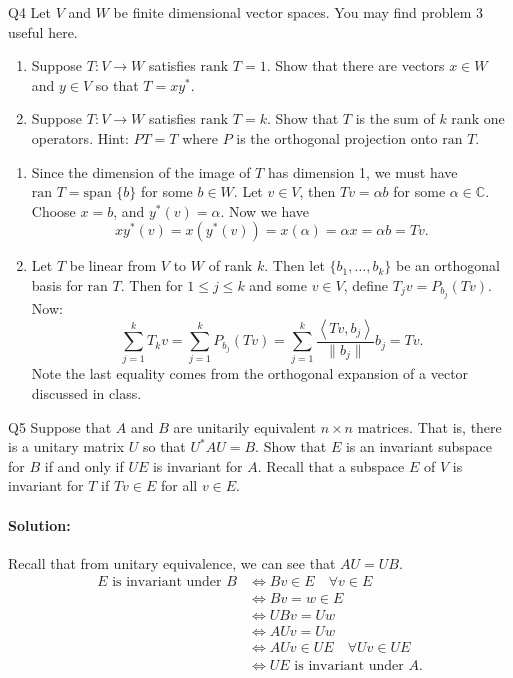 \documentclass{article}
\begin{document}
\begin{prob}{Q4}
Let $V$ and $W$ be finite dimensional vector spaces. You may find problem 3 useful here.
\begin{enumerate}[label= (\alph*)] 
    \item Suppose $T: V \to W$ satisfies $\text{rank } T = 1$. Show that there are vectors $x \in W$ and $y \in V$ so that $T = xy^*$.
    \item Suppose $T: V \to W$ satisfies $\text{rank } T = k$. Show that $T$ is the sum of $k$ rank one operators. Hint: $PT = T$ where $P$ is the orthogonal projection onto $\text{ran } T$.
\end{enumerate}
\end{prob}
\begin{enumerate}[label= (\alph*)] 
    \item Since the dimension of the image of $T$ has dimension 1, we must have $\text{ran }T=\text{span }\{b\} $ for some $b\in W$. Let $v\in V$, then $Tv=\alpha b$ for some $\alpha\in \mathbb{C}$. Choose $x=b$, and $y^*(v)=\alpha$. Now we have 
        \[
        xy^* (v)=x(y^* (v))=x(\alpha)=\alpha x=\alpha b= Tv
        .\] 

    \item Let $T$ be linear from $V$ to $W$ of rank $k$. Then let $\{b_1,\ldots,b_k\} $ be an orthogonal basis for $\text{ran }T$. Then for $1\leq j\leq k$ and some $v\in V$, define $T_jv=P_{b_j}(Tv)$. Now:
        \[
            \sum_{j=1}^{k} T_k v=\sum_{j=1}^{k} P_{b_j}(Tv)=\sum_{j=1}^{k} \frac{\left<Tv,b_j \right>}{\|b_j\|}b_j=Tv
        .\] 
        Note the last equality comes from the orthogonal expansion of a vector discussed in class.%
\end{enumerate}

\begin{prob}{Q5}
Suppose that $A$ and $B$ are unitarily equivalent $n \times n$ matrices. That is, there is a unitary matrix $U$ so that $U^*AU = B$. Show that $E$ is an invariant subspace for $B$ if and only if $UE$ is invariant for $A$.
Recall that a subspace $E$ of $V$ is invariant for $T$ if $Tv \in E$ for all $v \in E$.
\end{prob}
\paragraph{Solution: }Recall that from unitary equivalence, we can see that $AU=UB$.
\begin{align*}
    E \text{ is invariant under }B&\iff Bv\in E\quad\forall v\in E\\
                        &\iff Bv=w\in E\\
                         &\iff UBv=Uw\\
                         &\iff AUv=Uw\\
                         &\iff AUv\in UE\quad \forall Uv\in UE\\
                         &\iff  UE \text{ is invariant under } A
.\end{align*}
\end{document}
